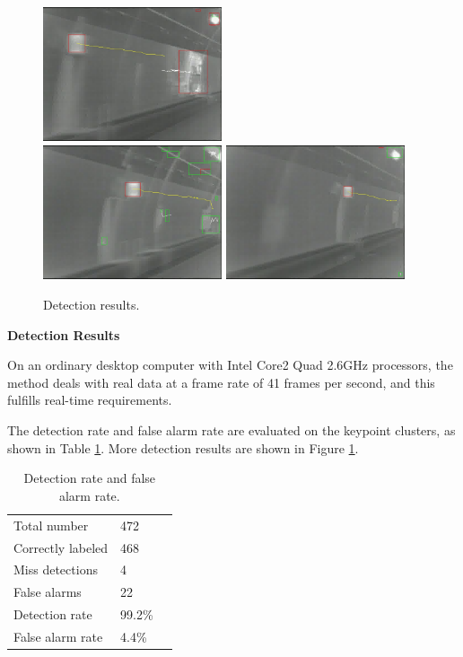 \begin{figure}
{}
{
\includegraphics[width=0.47\textwidth,bb=0 0 640 480]{02veriTrjimg00046.jpg}
}\\
{
\includegraphics[width=0.47\textwidth,bb=0 0 640 480]{00veriTrjimg00032.jpg}
}
{
\includegraphics[width=0.47\textwidth,bb=0 0 640 480]{06veriTrjimg00032.jpg}
}

\caption[Detection results]{Detection results.}
\label{fig:sixs}
\end{figure}

\textbf{Detection Results}

On an ordinary desktop computer with Intel Core2 Quad 2.6GHz processors, the method deals with real data at a frame rate of 41 frames per second, and this fulfills real-time requirements.


The detection rate and false alarm rate are evaluated on the keypoint clusters, as shown in Table \ref{tb:tb2}.
More detection results are shown in Figure \ref{fig:sixs}.
\begin{table}[h]
\centering
\begin{tabular}{lll}
     \hline
     \hline
    Total number &	472  \\
    Correctly labeled &	468   \\
    Miss detections &	4 &	  \\
    False alarms &	22    \\
    Detection rate &	99.2\% &	  \\
    False alarm rate &	4.4\% &	   \\
   \hline
\end{tabular}
\caption{Detection rate and false alarm rate.}\label{tb:tb2}
\end{table}

